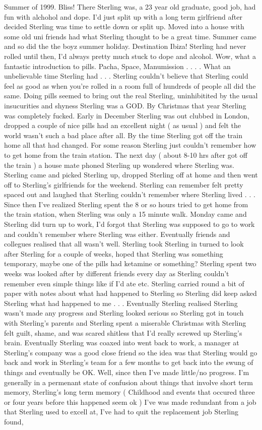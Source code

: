 \documentclass[12pt]{book}
\begin{document}
Summer of 1999. Bliss! There Sterling was, a 23 year old graduate, good job, had fun with alchohol and dope. I'd just split up with a long term girlfriend after decided Sterling was time to settle down or split up. Moved into a house with some old uni friends had what Sterling thought to be a great time. Summer came and so did the the boyz summer holiday. Destination Ibiza! Sterling had never rolled until then, I'd always pretty much stuck to dope and alcohol. Wow, what a fantastic introduction to pills. Pacha, Space, Manumission . . .  . What an unbelievable time Sterling had . . .  Sterling couldn't believe that Sterling could feel as good as when you're rolled in a room full of hundreds of people all did the same. Doing pills seemed to bring out the real Sterling, uninhibitited by the usual insucurities and shyness Sterling was a GOD. By Christmas that year Sterling was completely fucked. Early in December Sterling was out clubbed in London, dropped a couple of nice pills had an excellent night ( as usual ) and felt the world wasn't such a bad place after all. By the time Sterling got off the train home all that had changed. For some reason Sterling just couldn't remember how to get home from the train station. The next day ( about 8-10 hrs after got off the train ) a house mate phoned Sterling up wondered where Sterling was. Sterling came and picked Sterling up, dropped Sterling off at home and then went off to Sterling's girlfriends for the weekend. Sterling can remember felt pretty spaced out and laughed that Sterling couldn't remember where Sterling lived . . .  Since then I've realized Sterling spent the 8 or so hours tried to get home from the train station, when Sterling was only a 15 minute walk. Monday came and Sterling did turn up to work, I'd forgot that Sterling was supposed to go to work and couldn't remember where Sterling was either. Eventually friends and collegues realised that all wasn't well. Sterling took Sterling in turned to look after Sterling for a couple of weeks, hoped that Sterling was something temporary, maybe one of the pills had ketamine or something? Sterling spent two weeks was looked after by different friends every day as Sterling couldn't remember even simple things like if I'd ate etc. Sterling carried round a bit of paper with notes about what had happened to Sterling so Sterling did keep asked Sterling what had happened to me . . .  Eventually Sterling realised Sterling wasn't made any progress and Sterling looked serious so Sterling got in touch with Sterling's parents and Sterling spent a miserable Christmas with Sterling felt guilt, shame, and was scared shitless that I'd really screwed up Sterling's brain. Eventually Sterling was coaxed into went back to work, a manager at Sterling's company was a good close friend so the idea was that Sterling would go back and work in Sterling's team for a few months to get back into the swung of things and eventually be OK. Well, since then I've made little/no progress. I'm generally in a permenant state of confusion about things that involve short term memory, Sterling's long term memory ( Childhood and events that occured three or four years before this happened seem ok ) I've was made redundant from a job that Sterling used to excell at, I've had to quit the replacement job Sterling found, 
\end{document}
